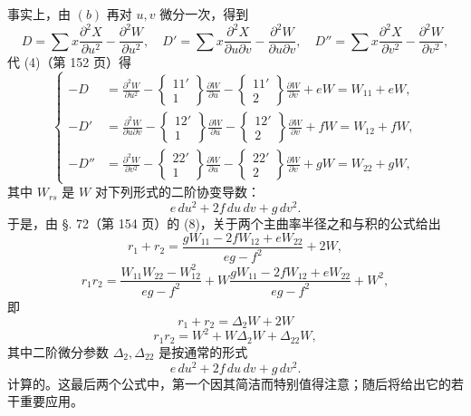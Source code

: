 事实上，由 \((b)\) 再对 \(u,v\) 微分一次，得到
\[
 D=\sum x\frac{\partial^2X}{\partial u^2}-\frac{\partial^2W}{\partial u^2},\quad
 D'=\sum x\frac{\partial^2X}{\partial u\partial v}-\frac{\partial^2W}{\partial u\partial v},\quad
 D''=\sum x\frac{\partial^2X}{\partial v^2}-\frac{\partial^2W}{\partial v^2},
\]
代 (4)（第 152 页）得
\begin{equation}\tag{35}
\left\{\begin{aligned}
 -D&=\frac{\partial^2W}{\partial u^2}-\left\{\begin{matrix}11'\\1\end{matrix}\right\}\frac{\partial W}{\partial u}-\left\{\begin{matrix}11'\\2\end{matrix}\right\}\frac{\partial W}{\partial v}+eW=W_{11}+eW,\\
 -D'&=\frac{\partial^2W}{\partial u\partial v}-\left\{\begin{matrix}12'\\1\end{matrix}\right\}\frac{\partial W}{\partial u}-\left\{\begin{matrix}12'\\2\end{matrix}\right\}\frac{\partial W}{\partial v}+fW=W_{12}+fW,\\
 -D''&=\frac{\partial^2W}{\partial v^2}-\left\{\begin{matrix}22'\\1\end{matrix}\right\}\frac{\partial W}{\partial u}-\left\{\begin{matrix}22'\\2\end{matrix}\right\}\frac{\partial W}{\partial v}+gW=W_{22}+gW,
\end{aligned}\right.
\end{equation}
其中 \(W_{rs}\) 是 \(W\) 对下列形式的二阶协变导数：
\[
 e\,du^2+2f\,du\,dv+g\,dv^2.
\]
于是，由 \S. 72（第 154 页）的 (8)，关于两个主曲率半径之和与积的公式给出
\[
 r_1+r_2=\frac{gW_{11}-2fW_{12}+eW_{22}}{eg-f^2}+2W,
\]
\[
 r_1r_2=\frac{W_{11}W_{22}-W_{12}^2}{eg-f^2}+W\frac{gW_{11}-2fW_{12}+eW_{22}}{eg-f^2}+W^2,
\]
即
\begin{equation}\tag{37}
 r_1+r_2=\Delta_2 W+2W
\end{equation}
\begin{equation}\tag{38}
 r_1r_2=W^2+W\Delta_2W+\Delta_{22}W,
\end{equation}
其中二阶微分参数 \(\Delta_2,\Delta_{22}\) 是按通常的形式
\[
 e\,du^2+2f\,du\,dv+g\,dv^2.
\]
计算的。这最后两个公式中，第一个因其简洁而特别值得注意；随后将给出它的若干重要应用。


